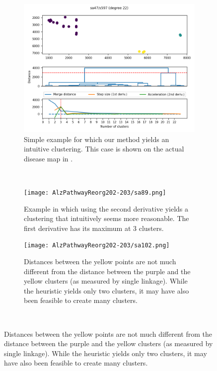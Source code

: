 \documentclass[
	fontsize=10pt, %
	twoside=true, %
	secnumdepth=1, %
  toc=indentunnumbered %
]{kaobook}
\begin{document}
\begin{figure}[h]
  \centering
  \begin{subfigure}{0.48\linewidth}
    \includegraphics[width=\textwidth]{attachment-examples/s597/dendrogram.png}
    \caption{
      Simple example for which our method yields an intuitive clustering. This
      case is shown on the actual disease map in .
    }
    \label{fig:s597-dendrogram}
  \end{subfigure}
  ~~~
  \begin{subfigure}{0.48\linewidth}
    \texttt{[image: AlzPathwayReorg202-203/sa89.png]}
    \caption{Example in which using the second derivative yields a clustering
      that intuitively seems more reasonable. The first derivative has its
      maximum at 3 clusters. 
    }
    \label{fig:dendro-b}
  \end{subfigure}
  \linebreak
      \begin{subfigure}{0.48\linewidth}
        \texttt{[image: AlzPathwayReorg202-203/sa102.png]}
        \caption{Distances between the yellow points are not much
          different from the distance between the purple and the yellow clusters
          (as measured by single linkage). While the heuristic yields
          only two clusters, it may have also been feasible to create many clusters.
        }
        \label{fig:dendro-c}
      \end{subfigure}
      ~~~

\end{figure}
\end{document}
